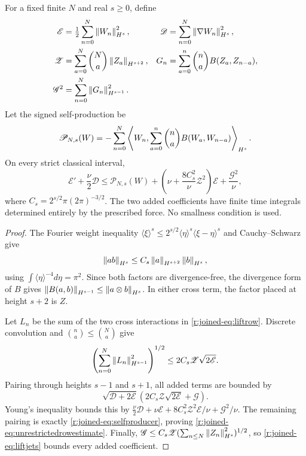 \begin{theorem}\label{r:joined-thm:lift}
For a fixed finite $N$ and real $s\ge0$, define
\begin{equation}\label{r:joined-eq:liftenergy}
\begin{aligned}
\mathscr E&=\tfrac12\sum_{n=0}^N\left\lVert W_n\right\rVert_{H^s}^2,
&\mathscr D&=\sum_{n=0}^N\left\lVert \nabla W_n\right\rVert_{H^s}^2,\\
\mathscr Z&=\sum_{a=0}^N\binom Na\left\lVert Z_a\right\rVert_{H^{s+2}},
&G_n&=\sum_{a=0}^n\binom na B(Z_a,Z_{n-a}),\\
\mathscr G^2&=\sum_{n=0}^N\left\lVert G_n\right\rVert_{H^{s-1}}^2.
\end{aligned}
\end{equation}
Let the signed self-production be
\begin{equation}\label{r:joined-eq:selfproducer}
\mathscr P_{N,s}(W)
=-\sum_{n=0}^N\left\langle W_n,
 \sum_{a=0}^n\binom na B(W_a,W_{n-a})\right\rangle_{H^s}.
\end{equation}
On every strict classical interval,
\begin{equation}\label{r:joined-eq:unrestrictedrowestimate}
\mathscr E'+\frac\nu2\mathscr D
\le\mathscr P_{N,s}(W)
+\left(\nu+\frac{8C_s^2}{\nu}\mathscr Z^2\right)\mathscr E
+\frac{\mathscr G^2}{\nu},
\end{equation}
where $C_s=2^{s/2}\pi(2\pi)^{-3/2}$. The two added coefficients have finite time integrals determined entirely by the prescribed force. No smallness condition is used.
\end{theorem}
\begin{proof}
The Fourier weight inequality
$\langle\xi\rangle^s\le2^{s/2}\langle\eta\rangle^s
\langle\xi-\eta\rangle^s$
and Cauchy--Schwarz give
\begin{equation*}
\left\lVert ab\right\rVert_{H^s}\le C_s\left\lVert a\right\rVert_{H^{s+2}}\left\lVert b\right\rVert_{H^s},
\end{equation*}
using $\int\langle\eta\rangle^{-4}d\eta=\pi^2$.
Since both factors are divergence-free, the divergence form of $B$ gives
$\left\lVert B(a,b)\right\rVert_{H^{s-1}}\le\left\lVert a\otimes b\right\rVert_{H^s}$.
In either cross term, the factor placed at height $s+2$ is $Z$.

Let $L_n$ be the sum of the two cross interactions in \eqref{r:joined-eq:liftrow}. Discrete convolution and $\binom na\le\binom Na$ give
\begin{equation*}
\left(\sum_{n=0}^N\left\lVert L_n\right\rVert_{H^{s-1}}^2\right)^{1/2}
\le2C_s\mathscr Z\sqrt{2\mathscr E}.
\end{equation*}
Pairing through heights $s-1$ and $s+1$, all added terms are bounded by
\begin{equation*}
\sqrt{\mathscr D+2\mathscr E}
\left(2C_s\mathscr Z\sqrt{2\mathscr E}+\mathscr G\right).
\end{equation*}
Young's inequality bounds this by
$\frac\nu2\mathscr D+\nu\mathscr E
+8C_s^2\mathscr Z^2\mathscr E/\nu+\mathscr G^2/\nu$.
The remaining pairing is exactly \eqref{r:joined-eq:selfproducer}, proving
\eqref{r:joined-eq:unrestrictedrowestimate}. Finally,
$\mathscr G\le C_s\mathscr Z(\sum_{n\le N}\left\lVert Z_n\right\rVert_{H^s}^2)^{1/2}$,
so \eqref{r:joined-eq:liftjets} bounds every added coefficient.
\end{proof}

